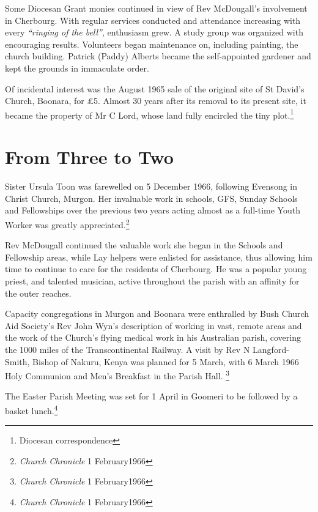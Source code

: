 Some Diocesan Grant monies continued in view of Rev McDougall's involvement in Cherbourg. With regular services conducted and attendance increasing with every \emph{``ringing of the bell''}, enthusiasm grew. A study group was organized with encouraging results. Volunteers began maintenance on, including painting, the church building. Patrick (Paddy) Alberts became the self-appointed gardener and kept the grounds in immaculate order.



Of incidental interest was the August 1965 sale of the original site of St David's Church, Boonara, for \pounds5. Almost 30 years after its removal to its present site, it became the property of Mr C Lord, whose land fully encircled the tiny plot.\footnote{Diocesan correspondence}


\section{From Three to Two}



Sister Ursula Toon was farewelled on 5 December 1966, following Evensong in Christ Church, Murgon. Her invaluable work in schools, GFS, Sunday Schools and Fellowships over the previous two years acting almost as a full-time Youth Worker was greatly appreciated.\footnote{\emph{Church Chronicle} 1 February1966}


Rev McDougall continued the valuable work she began in the Schools and Fellowship areas, while Lay helpers were enlisted for assistance, thus allowing him time to continue to care for the residents of Cherbourg. He was a popular young priest, and talented musician, active throughout the parish with an affinity for the outer reaches.



Capacity congregations in Murgon and Boonara were enthralled by Bush Church Aid Society's Rev John Wyn's description of working in vast, remote areas and the work of the Church's flying medical work in his Australian parish, covering the 1000 miles of the Transcontinental Railway. A visit by Rev N Langford-Smith, Bishop of Nakuru, Kenya was planned for 5 March, with 6 March 1966 Holy Communion and Men's Breakfast in the Parish Hall. \footnote{\emph{Church Chronicle} 1 February1966}


The Easter Parish Meeting was set for 1 April in Goomeri to be followed by a basket lunch.\footnote{\emph{Church Chronicle} 1 February1966}


